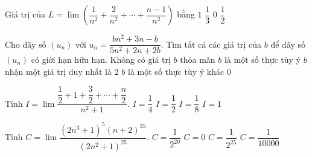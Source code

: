 \begin{ex}%
	Giá trị của $L=\lim\left(\dfrac{1}{n^2}+\dfrac{2}{n^2}+\cdots+\dfrac{n-1}{n^2}\right)$ bằng
	\choice
	{$1$}
	{$\dfrac{1}{3}$}
	{$0$}
	{\True $\dfrac{1}{2}$}
	
\end{ex}
\begin{ex}%
Cho dãy số $\left( u_n \right)$ với $u_n= \dfrac{bn^2+3n-b}{5n^2+2n+2b}$. Tìm tất cả các giá trị của $b$ để dãy số $\left( u_n \right)$ có giới hạn hữu hạn.
\choice
{Không có giá trị $b$ thỏa mãn}
{\True $b$ là một số thực tùy ý}
{$b$ nhận một giá trị duy nhất là $2$}
{$b$ là một số thực tùy ý khác $0$}
\end{ex} 
\begin{ex}%
Tính  $I=\lim\dfrac{\dfrac{1}{2}+1+\dfrac{3}{2}+\cdots +\dfrac{n}{2}}{n^2+1}$.
\choice
{\True $I=\dfrac{1}{4}$}
{$I=\dfrac{1}{2}$}
{$I=\dfrac{1}{8}$}
{$I=1$}
\end{ex}
\begin{ex}%
	Tính $C=\lim \dfrac{(2n^3+1)^5(n+2)^{35}}{(2n^2+1)^{25}}$.
	\choice
	{\True $C=\dfrac{1}{2^{20}}$}
	{$C=0$}
	{$C=\dfrac{1}{2^{25}}$}
	{$C=\dfrac{1}{10000}$}
\end{ex}
